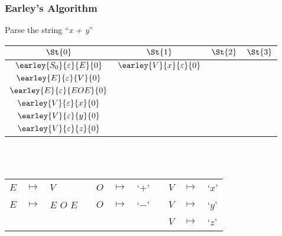 \begin{frame}
	\frametitle{Earley's Algorithm}
	\centering
	Parse the string ``\emph{x + y}''\\
	\vspace{0.5cm}
	\begin{tabular}{|c|c|c|c|}
		\hline
		$\St{0}$                          & $\St{1}$ & $\St{2}$ & $\St{3}$ \\
		\hline
		$\earley{S_0}{\varepsilon}{E}{0}$ & $\earley{V}{x}{\varepsilon}{0}$ & &\\
		$\earley{E}{\varepsilon}{V}{0}$   & & & \\
		$\earley{E}{\varepsilon}{EOE}{0}$ & & & \\
		$\earley{V}{\varepsilon}{x}{0}$   & & & \\
		$\earley{V}{\varepsilon}{y}{0}$   & & & \\
		$\earley{V}{\varepsilon}{z}{0}$   & & & \\
		\hline
	\end{tabular}

	\\~\\
	\vspace{0.5cm}
	\scriptsize
	\begin{tabular}{rclcrclcrcl}
		$E$ & $ \mapsto $ & $V$         && $O$ & $ \mapsto $ & `$+$' && $V$ & $ \mapsto $ & `$x$' \\
		$E$ & $ \mapsto $ & $E$ $O$ $E$ && $O$ & $ \mapsto $ & `$-$' && $V$ & $ \mapsto $ & `$y$' \\
		    &             &             &&     &             &       && $V$ & $ \mapsto $ & `$z$'
	\end{tabular}
\end{frame}

